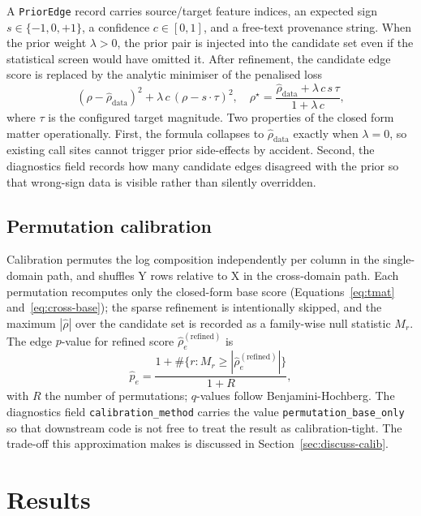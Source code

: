\documentclass[unnumsec,webpdf,contemporary,large]{oup-authoring-template}
\theoremstyle{thmstyleone}
\theoremstyle{thmstyletwo}
\theoremstyle{thmstylethree}
\begin{document}
A \texttt{PriorEdge} record carries source/target feature indices, an
expected sign $s \in \{-1, 0, +1\}$, a confidence $c \in [0, 1]$, and a
free-text provenance string. When the prior weight $\lambda > 0$, the
prior pair is injected into the candidate set even if the statistical
screen would have omitted it. After refinement, the candidate edge
score is replaced by the analytic minimiser of the penalised loss
\begin{equation}
(\rho - \hat\rho_{\text{data}})^2 +
\lambda\,c\,(\rho - s \cdot \tau)^2,
\quad
\rho^\star = \frac{\hat\rho_{\text{data}} + \lambda\,c\,s\,\tau}
                  {1 + \lambda\,c},
\label{eq:prior}
\end{equation}
where $\tau$ is the configured target magnitude. Two properties of the
closed form matter operationally. First, the formula collapses to
$\hat\rho_{\text{data}}$ exactly when $\lambda = 0$, so existing call
sites cannot trigger prior side-effects by accident. Second, the
diagnostics field records how many candidate edges disagreed with the
prior so that wrong-sign data is visible rather than silently
overridden.

\subsection{Permutation calibration}\label{sec:calib}

Calibration permutes the log composition independently per column in
the single-domain path, and shuffles Y rows relative to X in the
cross-domain path. Each permutation recomputes only the closed-form
base score (Equations~\ref{eq:tmat} and~\ref{eq:cross-base}); the
sparse refinement is intentionally skipped, and the maximum $|\hat\rho|$
over the candidate set is recorded as a family-wise null statistic
$M_r$. The edge $p$-value for refined score $\hat\rho_e^{(\text{refined})}$ is
\begin{equation}
\hat{p}_e =
\frac{1 + \#\{r : M_r \geq |\hat\rho_e^{(\text{refined})}|\}}{1 + R},
\label{eq:perm}
\end{equation}
with $R$ the number of permutations; $q$-values follow
Benjamini-Hochberg. The diagnostics field
\texttt{calibration\_method} carries the value
\texttt{permutation\_base\_only} so that downstream code is not free to
treat the result as calibration-tight. The trade-off this approximation
makes is discussed in Section~\ref{sec:discuss-calib}.

\section{Results}\label{sec:results}
\end{document}
